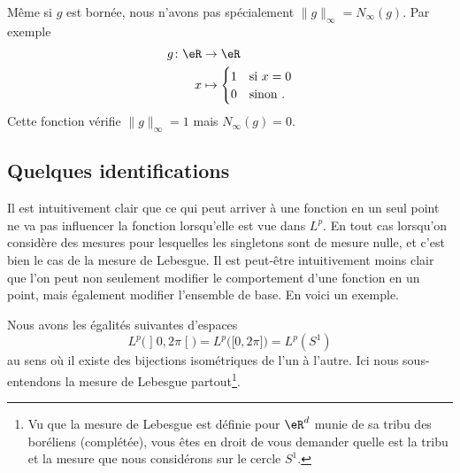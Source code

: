 \begin{example}
    Même si \( g\) est bornée, nous n'avons pas spécialement \( \| g \|_{\infty}=N_{\infty}(g)\). Par exemple
    \begin{equation}
        \begin{aligned}
            g\colon \eR&\to \eR \\
            x&\mapsto \begin{cases}
                1    &   \text{si } x=0\\
                0    &    \text{sinon }.
            \end{cases}
        \end{aligned}
    \end{equation}
    Cette fonction vérifie \( \| g \|_{\infty}=1\) mais \( N_{\infty}(g)=0\).
\end{example}

\subsection{Quelques identifications}

Il est intuitivement clair que ce qui peut arriver à une fonction en un seul point ne va pas influencer la fonction lorsqu'elle est vue dans \( L^p\). En tout cas lorsqu'on considère des mesures pour lesquelles les singletons sont de mesure nulle, et c'est bien le cas de la mesure de Lebesgue. Il est peut-être intuitivement moins clair que l'on peut non seulement modifier le comportement d'une fonction en un point, mais également modifier l'ensemble de base. En voici un exemple.

\begin{proposition}
    Nous avons les égalités suivantes d'espaces
    \begin{equation}
    L^p\big( \mathopen] 0 , 2\pi \mathclose[ \big)=L^p\big( \mathopen[ 0 , 2\pi \mathclose] \big)=L^p(S^1)
    \end{equation}
    au sens où il existe des bijections isométriques de l'un à l'autre. Ici nous sous-entendons la mesure de Lebesgue partout\footnote{Vu que la mesure de Lebesgue est définie pour \( \eR^d\) munie de sa tribu des boréliens (complétée), vous êtes en droit de vous demander quelle est la tribu et la mesure que nous considérons sur le cercle \( S^1\).}.
\end{proposition}


